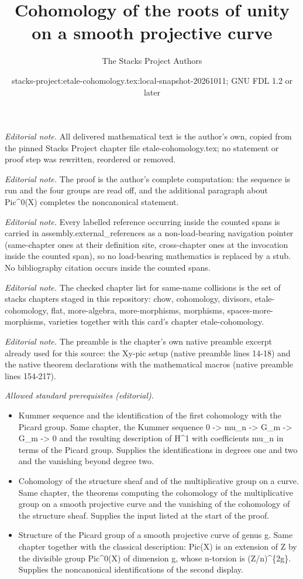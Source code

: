\documentclass[10pt,a4paper]{amsart}
\title{Cohomology of the roots of unity on a smooth projective curve}
\author{The Stacks Project Authors}
\date{stacks-project:etale-cohomology.tex:local-snapshot-20261011; GNU FDL 1.2 or later}
\theoremstyle{plain}
\theoremstyle{definition}
\theoremstyle{remark}
\numberwithin{equation}{subsection}
\begin{document}
\maketitle
\noindent\textit{Editorial note.} All delivered mathematical text is the author's own, copied from the pinned Stacks Project chapter file etale-cohomology.tex; no statement or proof step was rewritten, reordered or removed.\par\medskip
\noindent\textit{Editorial note.} The proof is the author's complete computation: the sequence is run and the four groups are read off, and the additional paragraph about Pic\textasciicircum{}0(X) completes the noncanonical statement.\par\medskip
\noindent\textit{Editorial note.} Every labelled reference occurring inside the counted spans is carried in assembly.external\_references as a non-load-bearing navigation pointer (same-chapter ones at their definition site, cross-chapter ones at the invocation inside the counted span), so no load-bearing mathematics is replaced by a stub. No bibliography citation occurs inside the counted spans.\par\medskip
\noindent\textit{Editorial note.} The checked chapter list for same-name collisions is the set of stacks chapters staged in this repository: chow, cohomology, divisors, etale-cohomology, flat, more-algebra, more-morphisms, morphisms, spaces-more-morphisms, varieties together with this card's chapter etale-cohomology.\par\medskip
\noindent\textit{Editorial note.} The preamble is the chapter's own native preamble excerpt already used for this source: the Xy-pic setup (native preamble lines 14-18) and the native theorem declarations with the mathematical macros (native preamble lines 154-217).\par\medskip
\noindent\textit{Allowed standard prerequisites (editorial).}\begin{itemize}
\item Kummer sequence and the identification of the first cohomology with the Picard group. Same chapter, the Kummer sequence 0 -> mu\_n -> G\_m -> G\_m -> 0 and the resulting description of H\textasciicircum{}1 with coefficients mu\_n in terms of the Picard group. Supplies the identifications in degrees one and two and the vanishing beyond degree two.
\item Cohomology of the structure sheaf and of the multiplicative group on a curve. Same chapter, the theorems computing the cohomology of the multiplicative group on a smooth projective curve and the vanishing of the cohomology of the structure sheaf. Supplies the input listed at the start of the proof.
\item Structure of the Picard group of a smooth projective curve of genus g. Same chapter together with the classical description: Pic(X) is an extension of Z by the divisible group Pic\textasciicircum{}0(X) of dimension g, whose n-torsion is (Z/n)\textasciicircum{}\{2g\}. Supplies the noncanonical identifications of the second display.
\end{itemize}\medskip
\end{document}

